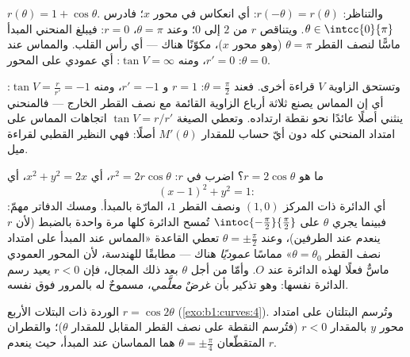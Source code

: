\begin{example}[القلبية]\label{ex:b1:curves:cardioid}
$r(\theta) = 1 + \cos\theta$. والتناظر: $r(-\theta)
= r(\theta)$: أي انعكاس في محور $x$؛ فادرس $\theta \in
\intcc{0}{\pi}$. ويتناقص $r$ من $2$ إلى $0$؛ وعند $\theta = \pi$،
$r = 0$: فيبلغ المنحني المبدأ ماسًّا لنصف القطر
$\theta = \pi$ (وهو محور $x$)، مكوّنًا  هناك --- أي رأس
القلب. والمماس عند $\theta = 0$: $r' = 0$، ومنه $\tan V = \infty$:
أي عمودي على المحور.

وتستحق الزاوية $V$ قراءة أخرى. فعند $\theta =
\frac\pi2$: $r = 1$ و $r' = -1$، ومنه $\tan V = \frac{r}{r'} =
-1$: أي إن المماس يصنع ثلاثة أرباع الزاوية القائمة مع نصف
القطر الخارج --- فالمنحني ينثني أصلًا عائدًا نحو
نقطة ارتداده. وتعطي الصيغة $\tan V = r/r'$ اتجاهات المماس
على امتداد المنحني كله دون أيّ حساب للمقدار $M'(\theta)$
أصلًا: فهي النظير القطبي لقراءة ميل.
\end{example}

\begin{example}
\label{ex:b1:curves:polarcircle}
ما هو  $r = 2\cos\theta$؟ اضرب في $r$:
$r^2 = 2r\cos\theta$، أي $x^2 + y^2 = 2x$، أي
\[
(x - 1)^2 + y^2 = 1 :
\]
أي الدائرة ذات المركز $(1, 0)$ ونصف القطر $1$، المارّة بالمبدأ.
ومسك الدفاتر مهمّ: فبينما يجري $\theta$ على
$\intoc{-\frac\pi2}{\frac\pi2}$ تُمسح الدائرة كلها
مرة واحدة بالضبط (لأن $r$ ينعدم عند الطرفين)، وعند $\theta =
\pm\frac\pi2$ تعطي القاعدة «المماس عند المبدأ على امتداد نصف القطر
$\theta = \theta_0$» مماسًا \emph{عموديًا} هناك ---
مطابقًا للهندسة، لأن المحور العمودي ماسٌّ فعلًا
لهذه الدائرة عند $O$. وأمّا من أجل $\theta$ بعد ذلك المجال، فإن $r < 0$
يعيد رسم الدائرة نفسها: وهو تذكير بأن  غرضٌ
\emph{معلَّمي}، مسموحٌ له بالمرور فوق نفسه.
\end{example}

\begin{omfigure}

{\small الوردة ذات البتلات الأربع $r = \cos 2\theta$
(\cref{exo:b1:curves:4}). وتُرسم البتلتان على امتداد محور $y$
بالمقدار $r < 0$ (فتُرسم النقطة على نصف القطر المقابل
للمقدار $\theta$)؛ والقطران المتقطّعان $\theta = \pm\frac\pi4$ هما
المماسان عند المبدأ، حيث ينعدم $r$.}
\end{omfigure}

